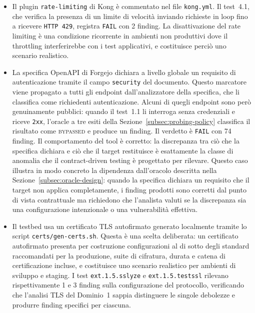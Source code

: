 \begin{itemize}

      \item Il plugin \texttt{rate-limiting} di Kong è commentato nel file
            \texttt{kong.yml}. Il test~4.1, che verifica la presenza di un limite
            di velocità inviando richieste in loop fino a ricevere
            \texttt{HTTP~429}, registra \texttt{FAIL} con 2 finding. La
            disattivazione del rate limiting è una condizione ricorrente in
            ambienti non produttivi dove il throttling interferirebbe con i test
            applicativi, e costituisce perciò uno scenario realistico.

      \item La specifica OpenAPI di Forgejo dichiara a livello globale un
            requisito di autenticazione tramite il campo \texttt{security} del
            documento. Questo marcatore viene propagato a tutti gli endpoint
            dall'analizzatore della specifica, che li classifica come richiedenti
            autenticazione. Alcuni di quegli endpoint sono però genuinamente
            pubblici: quando il test~1.1 li interroga senza credenziali e riceve
            \texttt{2xx}, l'oracle a tre esiti della
            Sezione~\ref{subsec:probing-policy} classifica il risultato come
            \textsc{bypassed} e produce un finding. Il verdetto è \texttt{FAIL}
            con 74 finding. Il comportamento del tool è corretto: la discrepanza
            tra ciò che la specifica dichiara e ciò che il target restituisce è
            esattamente la classe di anomalia che il contract-driven testing è
            progettato per rilevare. Questo caso illustra in modo concreto la dipendenza dall'oracolo
            descritta nella Sezione~\ref{subsec:oracle-design}: quando la specifica
            dichiara un requisito che il target non applica completamente, i finding
            prodotti sono corretti dal punto di vista contrattuale ma richiedono
            che l'analista valuti se la discrepanza sia una configurazione
            intenzionale o una vulnerabilità effettiva.

      \item Il testbed usa un certificato \gls{TLS} autofirmato generato localmente
            tramite lo script \texttt{certs/gen-certs.sh}. Questa è una scelta
            deliberata: un certificato autofirmato presenta per costruzione
            configurazioni al di sotto degli standard raccomandati per la produzione,
            suite di cifratura, durata e catena di certificazione incluse, e
            costituisce uno scenario realistico per ambienti di sviluppo e staging.
            I test \texttt{ext.1.5.sslyze} e \texttt{ext.1.5.testssl} rilevano
            rispettivamente 1 e 3 finding sulla configurazione del protocollo,
            verificando che l'analisi \gls{TLS} del Dominio~1 sappia distinguere
            le singole debolezze e produrre finding specifici per ciascuna.

\end{itemize}

